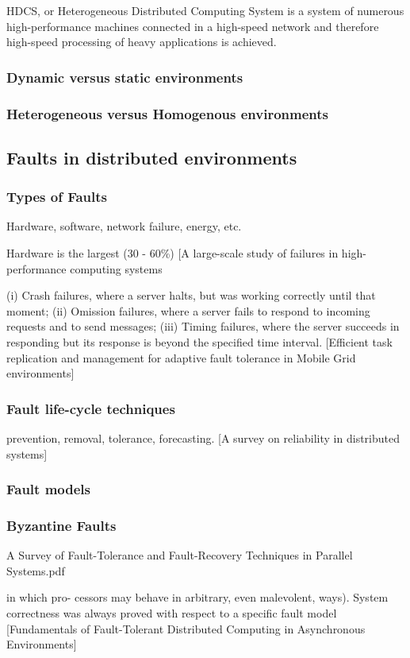 \documentclass{cslthse-msc}
\begin{document}
HDCS, or Heterogeneous Distributed Computing System is a system of numerous high-performance machines connected in a high-speed network and therefore high-speed processing of heavy applications is achieved. 
\subsubsection{Dynamic versus static environments}
\subsubsection{Heterogeneous versus Homogenous environments}
\subsection{Faults in distributed environments}
\subsubsection{Types of Faults}
Hardware, software, network failure, energy, etc.

Hardware is the largest (30 - 60\%) [A large-scale study of failures in high-performance computing systems

(i) Crash failures, where a server halts, but was working correctly until that moment; (ii) Omission failures, where a server fails to respond to incoming requests and to send messages; (iii) Timing failures, where the server succeeds in responding but its response is beyond the specified time interval. [Efficient task replication and management for adaptive fault tolerance in Mobile Grid environments]

\subsubsection{Fault life-cycle techniques}
prevention, removal, tolerance, forecasting. [A survey on reliability in distributed systems]

\subsubsection{Fault models}
\subsubsection*{Byzantine Faults}
A Survey of Fault-Tolerance and Fault-Recovery Techniques in Parallel Systems.pdf

in which pro- cessors may behave in arbitrary, even malevolent, ways). System correctness was always proved with respect to a specific fault model [Fundamentals of Fault-Tolerant Distributed Computing in Asynchronous Environments]
\end{document}
